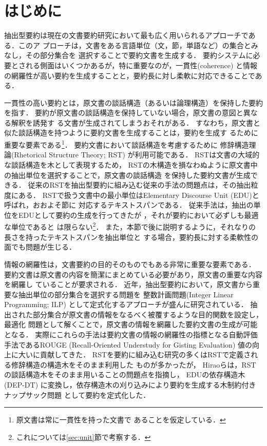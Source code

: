 \documentclass[japanese]{jnlp_1.4}
\begin{document}
\maketitle

\section{はじめに}

抽出型要約は現在の文書要約研究において最も広く用いられるアプローチである．このア
プローチは，文書をある言語単位（文，節，単語など）の集合とみなし，その部分集合を
選択することで要約文書を生成する．
要約システムに必要とされる側面はいくつかあるが，特に重要なのが，一貫性(coherence)
\cite{hobbs85,mann:88}
と情報の網羅性が高い要約を生成することと，要約長に対し柔軟に対応できることである．

一貫性の高い要約とは，原文書の談話構造（あるいは論理構造）を保持した要約を指す．
要約が原文書の談話構造を保持していない場合，原文書の意図と異なる解釈を誘発す
る文書が生成されてしまうおそれがある．
すなわち，原文書と似た談話構造を持つように要約文書を生成することは，要約を生成す
るために重要な要素である\footnote{原文書は常に一貫性を持った文書で
あることを仮定している．}．
要約文書において談話構造を考慮するために
修辞構造理論(Rhetorical Structure Theory; RST)
\cite{mann:88}が利用可能である．
RSTは文書の大域的な談話構造を木として表現するため，
RSTの木構造を損なわぬように原文書中の抽出単位を選択することで，原文書の談話構造
を保持した要約文書が生成できる\cite{marcu:98,daume:02,hirao:13}．
従来のRSTを抽出型要約に組み込む従来の手法の問題点は，その抽出粒度にある．
RSTで扱う文書中の最小単位はElementary Discourse Unit (EDU)と呼ばれ，おおよそ節に
対応するテキストスパンである．
従来手法は，抽出の単位をEDUとして要約の生成を行ってきたが
，それが要約において必ずしも最適な単位であると
は限らない\footnote{これについては\ref{sec:unit}節で考察する．}．
また，本節で後に説明するように，それなりの長さを持ったテキストスパンを抽出単位と
する場合，要約長に対する柔軟性の面でも問題が生じる．



情報の網羅性は，文書要約の目的そのものでもある非常に重要な要素である．
要約文書は原文書の内容を簡潔にまとめている必要があり，原文書の重要な内容を網羅し
ていることが要求される．
近年，抽出型要約において，原文書から重要な抽出単位の部分集合を選択する問題を
整数計画問題(Integer Linear Programming; ILP)
として定式化するアプローチが盛んに研究されている．
抽出された部分集合が原文書の情報をなるべく被覆するような目的関数を設定し，最適化
問題として解くことで，原文書の情報を網羅した要約文書の生成が可能となる．
実際にこれらの手法は要約文書の情報の網羅性の指標となる自動評価手法であるROUGE
(Recall-Oriented Understudy for Gisting Evaluation)\cite{lin:04}
値の向上に大いに貢献してきた\cite{mcdonald:07,filatova:04,takamura:09}．
RSTを要約に組み込む研究の多くはRSTで定義される修辞構造の構造木をそのまま利用した
ものが多かった\cite{marcu:98,daume:02}が，
Hiraoら\cite{hirao:13}は，RSTの談話構造木をそのまま用いることの問題点を指摘し，
EDUの依存構造木(DEP-DT)
に変換し，依存構造木の刈り込みにより要約を生成する木制約付きナップサック問題
\cite{johnson:83}として要約を定式化した．
\end{document}
